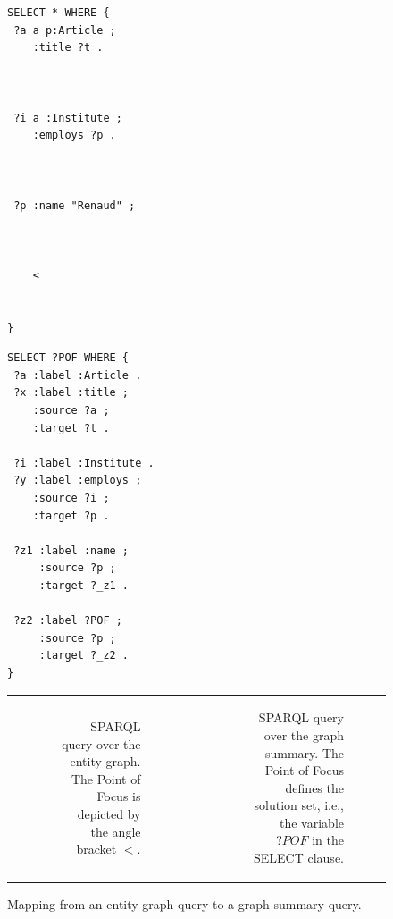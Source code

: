 \begin{figure}

	\newsavebox{\sparql}
	\begin{lrbox}{\sparql}
		\begin{minipage}{0.3\textwidth}
			\centering
			\expandafter\def\csname PY@tok@err\endcsname{}
			\begin{verbatim}
SELECT * WHERE {
 ?a a p:Article ;
    :title ?t .



 ?i a :Institute ;
    :employs ?p .



 ?p :name "Renaud" ;



    <


}
\end{verbatim}
\end{minipage}
\end{lrbox}


\newsavebox{\sparqlSum}
\begin{lrbox}{\sparqlSum}
	\begin{minipage}{0.4\textwidth}
		\centering
		\begin{verbatim}
SELECT ?POF WHERE {
 ?a :label :Article .
 ?x :label :title ;
    :source ?a ;
    :target ?t .

 ?i :label :Institute .
 ?y :label :employs ;
    :source ?i ;
    :target ?p .

 ?z1 :label :name ;
     :source ?p ;
     :target ?_z1 .

 ?z2 :label ?POF ;
     :source ?p ;
     :target ?_z2 .
}
\end{verbatim}
\end{minipage}
\end{lrbox}

\begin{tabular}{crccr}
	\phantom{a}
	&
	\begin{subfigure}[t]{.275\textwidth}
		\centering
		\usebox{\sparql}
		\caption{SPARQL query over the entity graph. The Point of Focus is depicted by the angle bracket $<$.}
		\label{fig:entity-sparql}
	\end{subfigure}
	& \phantom{a} & \phantom{a} &
	\begin{subfigure}[t]{.55\textwidth}
		\centering
		\usebox{\sparqlSum}
		\caption{SPARQL query over the graph summary. The Point of Focus defines the solution set, i.e., the variable $?POF$ in the SELECT clause.}
		\label{fig:gs-sparql}
	\end{subfigure}
	\\
\end{tabular}
\caption{Mapping from an entity graph query to a graph summary query.}
\label{fig:entity-gs-sparql}
\end{figure}

